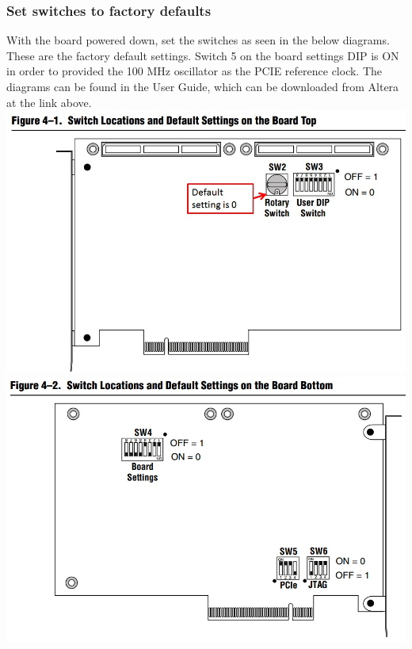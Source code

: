 \documentclass{article}
\begin{document}
\subsubsection*{Set switches to factory defaults}
 With the board powered down, set the switches as seen in the below diagrams. These are the factory default settings. Switch 5 on the board settings DIP is ON in order to provided the 100 MHz oscillator as the PCIE reference clock. The diagrams can be found in the User Guide, which can be downloaded from Altera at the link above.\\\smallskip
\includegraphics[scale=0.5]{sw1}\\
\includegraphics[scale=0.5]{sw2}\\
\end{document}
